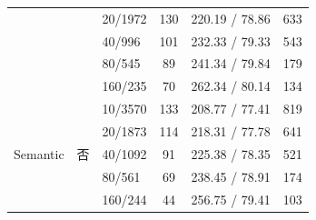\begin{table}[!t]
\begin{tabular}{lclccc}
    &&20/1972 &130&220.19 / 78.86&633\\
    &&40/996 &101&232.33 / 79.33&543\\
    &&80/545 &89&241.34 / 79.84&179\\
    &&160/235 &70&262.34 / 80.14&134\\
  \midrule
  \multirow{5}{*}{Semantic}  &\multirow{5}{*}{否} &10/3570 &133&208.77 / 77.41&819\\
    & &20/1873 &114&218.31 / 77.78&641\\
    & &40/1092 &91&225.38 / 78.35&521\\
    & &80/561 &69&238.45 / 78.91&174\\
    & &160/244 &44&256.75 / 79.41&103\\
\bottomrule
  \end{tabular}
\end{table} 